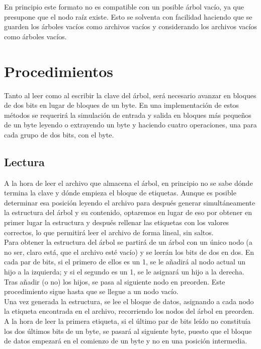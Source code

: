 \documentclass{article}
\begin{document}
En principio este formato no es compatible con un posible árbol vacío, ya que
presupone que el nodo raíz existe. Esto se solventa con facilidad haciendo que se
guarden los árboles vacíos como archivos vacíos y considerando los archivos vacíos
como árboles vacíos.

\section{Procedimientos}

Tanto al leer como al escribir la clave del árbol, será necesario avanzar en
bloques de dos bits en lugar de bloques de un byte. En una implementación de estos
métodos se requerirá la simulación de entrada y salida en bloques más pequeños de
un byte leyendo o extrayendo un byte y haciendo cuatro operaciones, una para cada
grupo de dos bits, con el byte.

\subsection{Lectura}

A la hora de leer el archivo que almacena el árbol, en principio no se sabe dónde
termina la clave y dónde empieza el bloque de etiquetas. Aunque es posible
determinar esa posición leyendo el archivo para después generar simultáneamente la
estructura del árbol y su contenido, optaremos en lugar de eso por obtener en
primer lugar la estructura y después rellenar las etiquetas con los valores
correctos, lo que permitirá leer el archivo de forma lineal, sin saltos. \\

Para obtener la estructura del árbol se partirá de un árbol con un único nodo (a
no ser, claro está, que el archivo esté vacío) y se leerán los bits de dos en dos.
En cada par de bits, si el primero de ellos es un 1, se le añadirá al nodo actual
un hijo a la izquierda; y si el segundo es un 1, se le asignará un hijo a la
derecha. Tras añadir (o no) los hijos, se pasa al siguiente nodo en preorden. Este
procedimiento sigue hasta que se llegue a un nodo vacío. \\

Una vez generada la estructura, se lee el bloque de datos, asignando a cada nodo la
etiqueta encontrada en el archivo, recorriendo los nodos del árbol en preorden. A
la hora de leer la primera etiqueta, si el último par de bits leído no constituía
los dos últimos bits de un byte, se pasará al siguiente byte, puesto que el bloque
de datos empezará en el comienzo de un byte y no en una posición intermedia. \\
\end{document}
